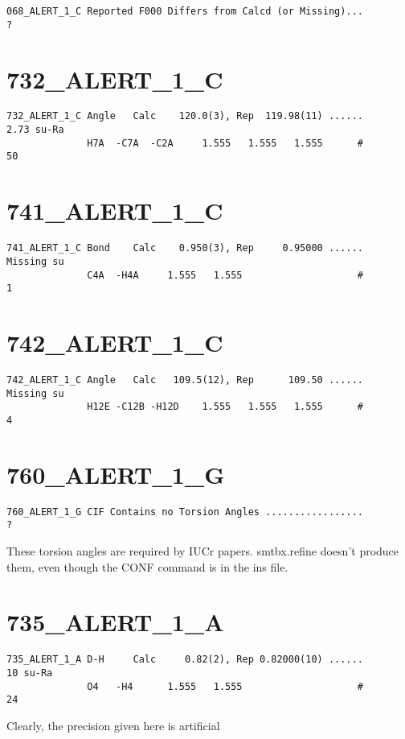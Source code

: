 \documentclass[a4paper,10pt]{article}
\begin{document}
{\bf
\begin{verbatim}
068_ALERT_1_C Reported F000 Differs from Calcd (or Missing)...          ?
\end{verbatim}
}


\section*{732\_ALERT\_1\_C}

{\bf
\begin{verbatim}
732_ALERT_1_C Angle   Calc    120.0(3), Rep  119.98(11) ......       2.73 su-Ra
              H7A  -C7A  -C2A     1.555   1.555   1.555      #         50
\end{verbatim}
}


\section*{741\_ALERT\_1\_C}

{\bf
\begin{verbatim}
741_ALERT_1_C Bond    Calc    0.950(3), Rep     0.95000 ......    Missing su
              C4A  -H4A     1.555   1.555                    #          1
\end{verbatim}
}


\section*{742\_ALERT\_1\_C}

{\bf
\begin{verbatim}
742_ALERT_1_C Angle   Calc   109.5(12), Rep      109.50 ......    Missing su
              H12E -C12B -H12D    1.555   1.555   1.555      #          4
\end{verbatim}
}


\section*{760\_ALERT\_1\_G}

{\bf
\begin{verbatim}
760_ALERT_1_G CIF Contains no Torsion Angles .................          ?
\end{verbatim}
}

These torsion angles are required by IUCr papers. smtbx.refine doesn't produce them, even though the CONF command is in the ins file.

\section*{735\_ALERT\_1\_A}

{\bf
\begin{verbatim}
735_ALERT_1_A D-H     Calc     0.82(2), Rep 0.82000(10) ......         10 su-Ra
              O4   -H4      1.555   1.555                    #         24
\end{verbatim}

Clearly, the precision given here is artificial

}
\end{document}
